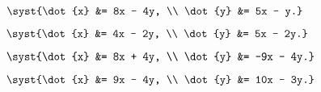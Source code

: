 \begin{multicols}{4}
\begin{enumtasks}
			\item \( \syst{\dot{x} &= 8x - 4y, \\ \dot{y} &= 5x - y.} \) %
			\item \( \syst{\dot{x} &= 4x - 2y, \\ \dot{y} &= 5x - 2y.} \) %
			\item \( \syst{\dot{x} &= 8x + 4y, \\ \dot{y} &= -9x - 4y.} \) %
			\item \( \syst{\dot{x} &= 9x - 4y, \\ \dot{y} &= 10x - 3y.} \) %

\end{enumtasks}
\end{multicols}
